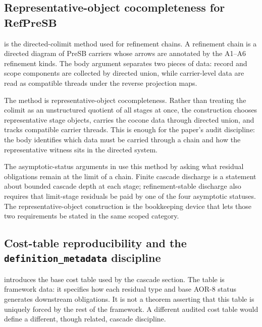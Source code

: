 \documentclass[11pt]{article}
\newcommand{\RefPreSB}{\mathbf{RefPreSB}}
\theoremstyle{definition}
\begin{document}
\subsection{\texorpdfstring{Representative-object cocompleteness for
\(\RefPreSB\)}{Representative-object cocompleteness for RefPreSB}}
\label{subsec:aor-methods-refpresb-cocomplete}

 is the directed-colimit method used
for refinement chains.  A refinement chain is a directed diagram of
PreSB carriers whose arrows are annotated by the A1--A6 refinement
kinds.  The body argument separates two pieces of data: record and
scope components are collected by directed union, while carrier-level
data are read as compatible threads under the reverse projection maps.

The method is representative-object cocompleteness.  Rather than treating
the colimit as an unstructured quotient of all stages at once, the
construction chooses representative stage objects, carries the cocone data
through directed union, and tracks compatible carrier threads.  This is
enough for the paper's audit discipline: the body identifies which data must
be carried through a chain and how the representative witness sits in the
directed system.

The asymptotic-status arguments in  use this
method by asking what residual obligations remain at the limit of a
chain.  Finite cascade discharge is a statement about bounded cascade
depth at each stage; refinement-stable discharge also requires that
limit-stage residuals be paid by one of the four asymptotic statuses.
The representative-object construction is the bookkeeping device that
lets those two requirements be stated in the same scoped category.

\subsection{\texorpdfstring{Cost-table reproducibility and the
\texttt{definition\_metadata} discipline}{Cost-table reproducibility
and definition metadata discipline}}
\label{subsec:aor-methods-cost-table-reproducibility}

 introduces the base cost table used by the
cascade section.  The table is framework data: it specifies how each
residual type and base AOR-8 status generates downstream obligations.
It is not a theorem asserting that this table is uniquely forced by the
rest of the framework.  A different audited cost table would define a
different, though related, cascade discipline.
\end{document}
